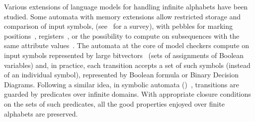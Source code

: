 Various extensions of language models for handling infinite alphabets have been studied.
Some automata with memory extensions
allow restricted storage and comparison of input symbols,
(see~\cite{Segoufin06csl} for a survey),
with pebbles for marking positions~\cite{NevenSchwentickVianu04FSMinfinite},
registers~\cite{KaminskiFrancez94},
or %
the possibility to compute on subsequences
with the same attribute values~\cite{Bojanczyk11FO2}. %
%
%
The automata at the core of model checkers
compute on input symbols represented by large bitvectors~\cite{Vardi07ciaa} %
(sets of assignments of Boolean variables) %
and, in practice,  %
each transition accepts a set of such symbols (instead of an individual symbol),
represented by Boolean formula or Binary Decision Diagrams.
%
Following a similar idea, %
in symbolic automata (\SA)~\cite{dAntoniVeanes17CAV,dAntoni21CACM},
transitions are guarded by predicates over infinite  domains.
With appropriate closure conditions on the sets of such predicates, %
all the good properties enjoyed over finite alphabets are preserved.

